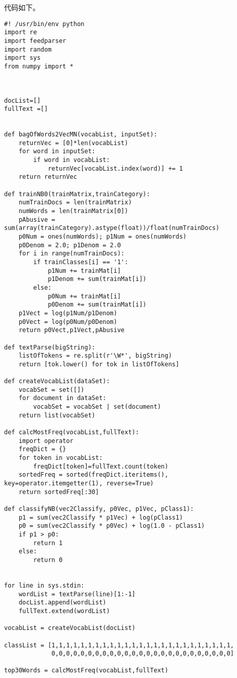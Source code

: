 代码如下。

\begin{lstlisting}
#! /usr/bin/env python
import re
import feedparser
import random
import sys
from numpy import *



docList=[]
fullText =[]


def bagOfWords2VecMN(vocabList, inputSet):
    returnVec = [0]*len(vocabList)
    for word in inputSet:
        if word in vocabList:
            returnVec[vocabList.index(word)] += 1
    return returnVec

def trainNB0(trainMatrix,trainCategory):
    numTrainDocs = len(trainMatrix)
    numWords = len(trainMatrix[0])
    pAbusive = sum(array(trainCategory).astype(float))/float(numTrainDocs)
    p0Num = ones(numWords); p1Num = ones(numWords)
    p0Denom = 2.0; p1Denom = 2.0
    for i in range(numTrainDocs):
        if trainClasses[i] == '1':
            p1Num += trainMat[i]
            p1Denom += sum(trainMat[i])
        else:
            p0Num += trainMat[i]
            p0Denom += sum(trainMat[i])
    p1Vect = log(p1Num/p1Denom)
    p0Vect = log(p0Num/p0Denom)
    return p0Vect,p1Vect,pAbusive

def textParse(bigString):
    listOfTokens = re.split(r'\W*', bigString)
    return [tok.lower() for tok in listOfTokens]

def createVocabList(dataSet):
    vocabSet = set([])
    for document in dataSet:
        vocabSet = vocabSet | set(document)
    return list(vocabSet)

def calcMostFreq(vocabList,fullText):
    import operator
    freqDict = {}
    for token in vocabList:
        freqDict[token]=fullText.count(token)
    sortedFreq = sorted(freqDict.iteritems(), key=operator.itemgetter(1), reverse=True)
    return sortedFreq[:30]

def classifyNB(vec2Classify, p0Vec, p1Vec, pClass1):
    p1 = sum(vec2Classify * p1Vec) + log(pClass1)
    p0 = sum(vec2Classify * p0Vec) + log(1.0 - pClass1)
    if p1 > p0:
        return 1
    else:
        return 0


for line in sys.stdin:
    wordList = textParse(line)[1:-1]
    docList.append(wordList)
    fullText.extend(wordList)

vocabList = createVocabList(docList)

classList = [1,1,1,1,1,1,1,1,1,1,1,1,1,1,1,1,1,1,1,1,1,1,1,1,1,
             0,0,0,0,0,0,0,0,0,0,0,0,0,0,0,0,0,0,0,0,0,0,0,0,0]

top30Words = calcMostFreq(vocabList,fullText)


\end{lstlisting}
